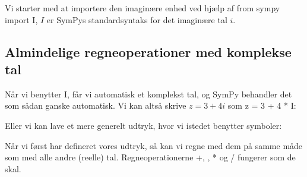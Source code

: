 \documentclass[letterpaper,10pt,english]{jupyterBook}
\begin{document}
Vi starter med at importere den imaginære enhed ved hjælp af from sympy import I, \(I\) er SymPys standardsyntaks for det imaginære tal \(i\).

\begin{sphinxVerbatim}[commandchars=\\\{\}]
   
   
    
\end{sphinxVerbatim}


\subsection{Almindelige regneoperationer med komplekse tal}
\label{\detokenize{notebooks/sympy/Notebook_kompleks:almindelige-regneoperationer-med-komplekse-tal}}
Når vi benytter I, får vi automatisk et komplekst tal, og SymPy behandler det som sådan ganske automatisk. Vi kan altså skrive \(z = 3 + 4i\) som z = 3 + 4 * I:

\begin{sphinxVerbatim}[commandchars=\\\{\}]
      
\end{sphinxVerbatim}

\noindent{}

Eller vi kan lave et mere generelt udtryk, hvor vi istedet benytter symboler:

\begin{sphinxVerbatim}[commandchars=\\\{\}]
    
      
\end{sphinxVerbatim}

\noindent{}

Når vi først har defineret vores udtryk, så kan vi regne med dem på samme måde som med alle andre (reelle) tal. Regneoperationerne +, \sphinxhyphen{}, * og / fungerer som de skal.
\end{document}

